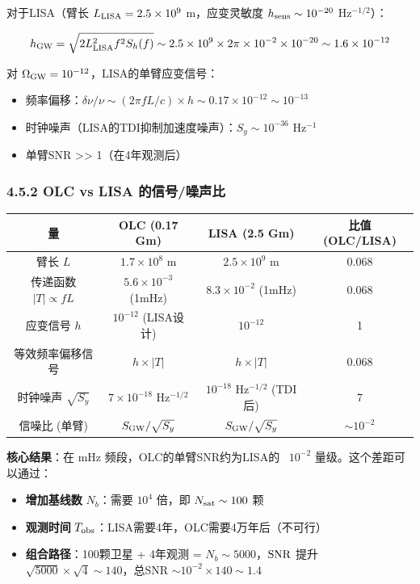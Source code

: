 \documentclass[12pt,a4paper]{article}
\begin{document}
对于LISA（臂长 $L_{\rm LISA} = 2.5 \times 10^9$ m，应变灵敏度 $h_{\rm sens} \sim 10^{-20}$ Hz$^{-1/2}$）：

$$h_{\rm GW} = \sqrt{2 L_{\rm LISA}^2 f^2 S_h(f)} \sim 2.5 \times 10^9 \times 2\pi \times 10^{-2} \times 10^{-20} \sim 1.6 \times 10^{-12}$$

对 $\Omega_{\rm GW} = 10^{-12}$，LISA的单臂应变信号：
\begin{itemize}
  \item 频率偏移：$\delta\nu/\nu \sim (2\pi f L/c) \times h \sim 0.17 \times 10^{-12} \sim 10^{-13}$
  \item 时钟噪声（LISA的TDI抑制加速度噪声）：$S_y \sim 10^{-36}$ Hz$^{-1}$
  \item 单臂SNR >> 1（在4年观测后）

\end{itemize}
\subsubsection{4.5.2 OLC vs LISA 的信号/噪声比}


\begin{tabular}{|c|c|c|c|}
\hline
量 & OLC (0.17 Gm) & LISA (2.5 Gm) & 比值 (OLC/LISA) \\
\hline
臂长 $L$ & $1.7 \times 10^8$ m & $2.5 \times 10^9$ m & 0.068 \\
传递函数 $|T| \propto fL$ & $5.6 \times 10^{-3}$ (1mHz) & $8.3 \times 10^{-2}$ (1mHz) & 0.068 \\
应变信号 $h$ & $10^{-12}$ (LISA设计) & $10^{-12}$ & 1 \\
等效频率偏移信号 & $h \times |T|$ & $h \times |T|$ & 0.068 \\
时钟噪声 $\sqrt{S_y}$ & $7 \times 10^{-18}$ Hz$^{-1/2}$ & $10^{-18}$ Hz$^{-1/2}$ (TDI后) & 7 \\
信噪比 (单臂) & $S_{\rm GW}/\sqrt{S_y}$ & $S_{\rm GW}/\sqrt{S_y}$ & $\sim 10^{-2}$ \\
\hline
\end{tabular}


\textbf{核心结果}：在 mHz 频段，OLC的单臂SNR约为LISA的 ~$10^{-2}$ 量级。这个差距可以通过：
\begin{itemize}
  \item[1] \textbf{增加基线数} $N_b$：需要 $10^4$ 倍，即 $N_{\rm sat} \sim 100$ 颗
  \item[2] \textbf{观测时间} $T_{\rm obs}$：LISA需要4年，OLC需要4万年后（不可行）
  \item[3] \textbf{组合路径}：100颗卫星 + 4年观测 = $N_b \sim 5000$，${\rm SNR}$ 提升 $\sqrt{5000} \times \sqrt{4} \sim 140$，总SNR $\sim 10^{-2} \times 140 \sim 1.4$

\end{itemize}
\end{document}
